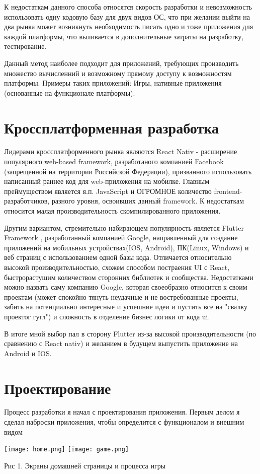 \documentclass[14pt, oneside]{altsu-report}
\begin{document}
К недостаткам данного способа относятся скорость разработки и невозможность использовать одну кодовую базу для двух видов ОС, что при желании выйти на два рынка может возникнуть необходимость писать одно и тоже приложения для каждой платформы, что выливается в дополнительные затраты на разработку, тестирование.

Данный метод наиболее подходит для приложений, требующих производить множество вычисленний и возможному прямому доступу к возможностям платформы. Примеры таких приложений: Игры, нативные приложения (основанные на функционале платформы).

\section*{Кроссплатформенная разработка}
Лидерами кроссплатформенного рынка являются React Nativ \cite{react} - расширение популярного web-based framework, разработаного компанией Facebook (запрещенной на территории Российской Федерации), призванного использовать написанный раннее код для web-приложения на мобилке. Главным преймуществом является я.п. JavaScript и ОГРОМНОЕ количество frontend-разработчиков, разного уровня, освоивших данный framework. К недостаткам относится малая производительность скомпилированного приложения. 

Другим вариантом, стремительно набирающем популярность является Flutter Framework \cite{flutter}, разработанный компанией Google, направленный для создание приложений на мобильных устройствах(IOS, Android), ПК(Linux, Windows) и веб страниц с использованием одной базы кода. Отличается относительно высокой производительностью, схожем способом постраения UI с React, быстрорастущим количеством сторонних библиотек и сообщества. Недостатками можно назвать саму компанию Google, которая своеобразно относится к своим проектам (может спокойно тянуть неудачные и не востребованные проекты, забить на потенциально интересные и успешние идеи и пустить все на "свалку проектог гугл") и сложность в отделение бизнес логики от кода ui.

В итоге мной выбор пал в сторону Flutter из-за высокой производительности (по сравнению с React nativ) и желанием в будущем выпустить приложение на Android и IOS.
\section{Проектирование}
Процесс разработки я начал с проектирования приложения. Первым делом я сделал наброски приложения, чтобы определится с функционалом и внешним видом\\
\begin{center}
\texttt{[image: home.png]}
\hspace{10pt}
\texttt{[image: game.png]}

   Рис 1. Экраны домашней страницы и процесса игры
\end{center}
\end{document}
